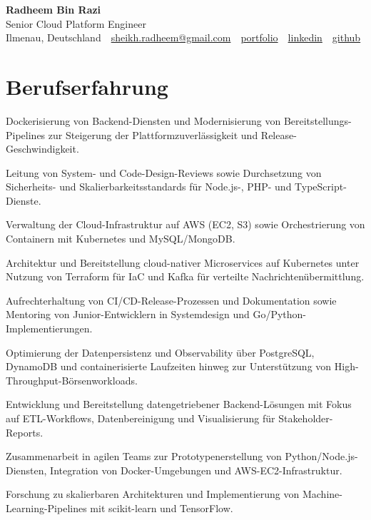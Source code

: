 \documentclass[11pt,a4paper]{resume}
\makeatletter
\newcommand{\Portfolio}{https://radheem.github.io/my-cv}
\newcommand{\PortfolioText}{portfolio}
\newcommand{\GitHub}{https://github.com/radheem}
\newcommand{\LinkedIn}{https://www.linkedin.com/in/radheem-razi}
\newcommand{\Email}{sheikh.radheem@gmail.com}
\makeatother
\begin{document}
\clearpage
{}

\begin{center}
  {\huge\bfseries Radheem Bin Razi}\\[3pt]
  {\large Senior Cloud Platform Engineer}\\[6pt]
  \small
  Ilmenau, Deutschland \,\textbar\,
  \href{mailto:\Email}{\Email} \,\textbar\,
  \href{\Portfolio}{\PortfolioText} \,\textbar\,
  \href{\LinkedIn}{linkedin} \,\textbar\,
  \href{\GitHub}{github}
\end{center}
\vspace{2pt}

\section{Berufserfahrung}

\bullets
  \item Dockerisierung von Backend-Diensten und Modernisierung von Bereitstellungs-Pipelines zur Steigerung der Plattformzuverlässigkeit und Release-Geschwindigkeit.
  \item Leitung von System- und Code-Design-Reviews sowie Durchsetzung von Sicherheits- und Skalierbarkeitsstandards für Node.js-, PHP- und TypeScript-Dienste.
  \item Verwaltung der Cloud-Infrastruktur auf AWS (EC2, S3) sowie Orchestrierung von Containern mit Kubernetes und MySQL/MongoDB.
\bulletsend
\vspace{3pt}
\bullets
  \item Architektur und Bereitstellung cloud-nativer Microservices auf Kubernetes unter Nutzung von Terraform für IaC und Kafka für verteilte Nachrichtenübermittlung.
  \item Aufrechterhaltung von CI/CD-Release-Prozessen und Dokumentation sowie Mentoring von Junior-Entwicklern in Systemdesign und Go/Python-Implementierungen.
  \item Optimierung der Datenpersistenz und Observability über PostgreSQL, DynamoDB und containerisierte Laufzeiten hinweg zur Unterstützung von High-Throughput-Börsenworkloads.
\bulletsend
\vspace{3pt}
\bullets
  \item Entwicklung und Bereitstellung datengetriebener Backend-Lösungen mit Fokus auf ETL-Workflows, Datenbereinigung und Visualisierung für Stakeholder-Reports.
  \item Zusammenarbeit in agilen Teams zur Prototypenerstellung von Python/Node.js-Diensten, Integration von Docker-Umgebungen und AWS-EC2-Infrastruktur.
  \item Forschung zu skalierbaren Architekturen und Implementierung von Machine-Learning-Pipelines mit scikit-learn und TensorFlow.
\bulletsend
\vspace{3pt}
\end{document}

